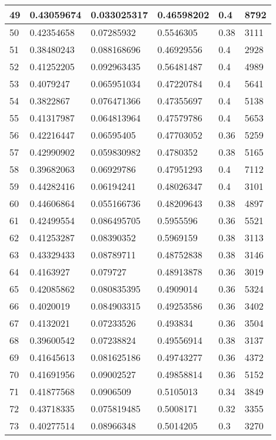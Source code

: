 \begin{longtable}{|l|l|l|l|l|l|}
49 & 0.43059674 & 0.033025317 & 0.46598202 & 0.4 & 8792 \\ \hline 
50 & 0.42354658 & 0.07285932 & 0.5546305 & 0.38 & 3111 \\ \hline 
51 & 0.38480243 & 0.088168696 & 0.46929556 & 0.4 & 2928 \\ \hline 
52 & 0.41252205 & 0.092963435 & 0.56481487 & 0.4 & 4989 \\ \hline 
53 & 0.4079247 & 0.065951034 & 0.47220784 & 0.4 & 5641 \\ \hline 
54 & 0.3822867 & 0.076471366 & 0.47355697 & 0.4 & 5138 \\ \hline 
55 & 0.41317987 & 0.064813964 & 0.47579786 & 0.4 & 5653 \\ \hline 
56 & 0.42216447 & 0.06595405 & 0.47703052 & 0.36 & 5259 \\ \hline 
57 & 0.42990902 & 0.059830982 & 0.4780352 & 0.38 & 5165 \\ \hline 
58 & 0.39682063 & 0.06929786 & 0.47951293 & 0.4 & 7112 \\ \hline 
59 & 0.44282416 & 0.06194241 & 0.48026347 & 0.4 & 3101 \\ \hline 
60 & 0.44606864 & 0.055166736 & 0.48209643 & 0.38 & 4897 \\ \hline 
61 & 0.42499554 & 0.086495705 & 0.5955596 & 0.36 & 5521 \\ \hline 
62 & 0.41253287 & 0.08390352 & 0.5969159 & 0.38 & 3113 \\ \hline 
63 & 0.43329433 & 0.08789711 & 0.48752838 & 0.38 & 3146 \\ \hline 
64 & 0.4163927 & 0.079727 & 0.48913878 & 0.36 & 3019 \\ \hline 
65 & 0.42085862 & 0.080835395 & 0.4909014 & 0.36 & 5324 \\ \hline 
66 & 0.4020019 & 0.084903315 & 0.49253586 & 0.36 & 3402 \\ \hline 
67 & 0.4132021 & 0.07233526 & 0.493834 & 0.36 & 3504 \\ \hline 
68 & 0.39600542 & 0.07238824 & 0.49556914 & 0.38 & 3137 \\ \hline 
69 & 0.41645613 & 0.081625186 & 0.49743277 & 0.36 & 4372 \\ \hline 
70 & 0.41691956 & 0.09002527 & 0.49858814 & 0.36 & 5152 \\ \hline 
71 & 0.41877568 & 0.0906509 & 0.5105013 & 0.34 & 3849 \\ \hline 
72 & 0.43718335 & 0.075819485 & 0.5008171 & 0.32 & 3355 \\ \hline 
73 & 0.40277514 & 0.08966348 & 0.5014205 & 0.3 & 3270 \\ \hline 

\end{longtable}
